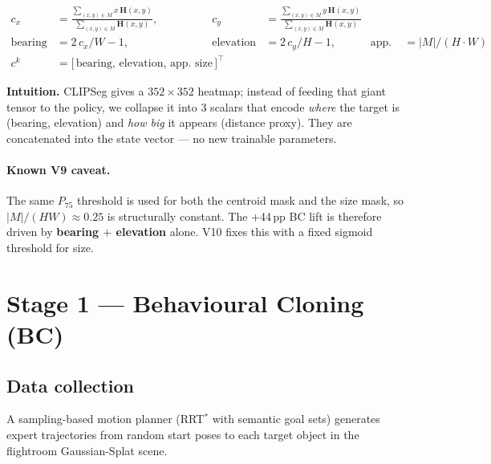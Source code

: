 \documentclass[11pt, a4paper]{article}
\begin{document}
\begin{formulabox}
\begin{align}
c_x &= \frac{\sum_{(x,y)\in M} x\,\bm{H}(x,y)}{\sum_{(x,y)\in M} \bm{H}(x,y)},
&
c_y &= \frac{\sum_{(x,y)\in M} y\,\bm{H}(x,y)}{\sum_{(x,y)\in M} \bm{H}(x,y)} \\[6pt]
\text{bearing}      &= 2\,c_x / W - 1, &
\text{elevation}    &= 2\,c_y / H - 1, &
\text{app.\ size}\;&= |M| / (H\cdot W) \\[4pt]
c^k &= \bigl[\,\text{bearing},\,\text{elevation},\,\text{app.\ size}\,\bigr]^\top
\end{align}
\end{formulabox}

\noindent
\textbf{Intuition.} CLIPSeg gives a $352{\times}352$ heatmap; instead of feeding
that giant tensor to the policy, we collapse it into 3 scalars that encode
\emph{where} the target is (bearing, elevation) and \emph{how big} it appears
(distance proxy). They are concatenated into the state vector --- no new
trainable parameters.

\paragraph{Known V9 caveat.} The same $P_{75}$ threshold is used for both the
centroid mask and the size mask, so $|M|/(HW)\approx 0.25$ is structurally
constant. The +44\,pp BC lift is therefore driven by \textbf{bearing $+$
elevation} alone. V10 fixes this with a fixed sigmoid threshold for size.

\section{Stage 1 --- Behavioural Cloning (BC)}

\subsection{Data collection}

A sampling-based motion planner (RRT$^{\!*}$ with semantic goal sets) generates
expert trajectories from random start poses to each target object in the
flightroom Gaussian-Splat scene.
\end{document}

